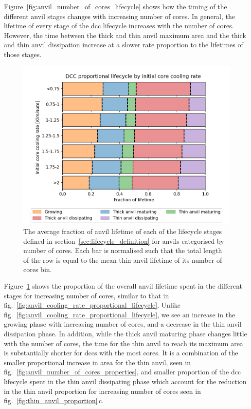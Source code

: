 Figure~\ref{fig:anvil_number_of_cores_lifecycle} shows how the timing of the different anvil stages changes with increasing number of cores.
In general, the lifetime of every stage of the \acrshort{dcc} lifecycle increases with the number of cores.
However, the time between the thick and thin anvil maximum area and the thick and thin anvil dissipation increase at a slower rate proportion to the lifetimes of those stages.

\begin{figure}[tp]
    \centering
    \includegraphics[width=\textwidth]{figures/chapter3_09.png}
    \caption[
    The average fraction of anvil lifetime of each lifecycle stage for anvils categorised by number of cores
    ]{
    The average fraction of anvil lifetime of each of the lifecycle stages defined in section~\ref{sec:lifecycle_definition} for anvils categorised by number of cores. Each bar is normalised such that the total length of the row is equal to the mean thin anvil lifetime of its number of cores bin.
    }
    \label{fig:anvil_number_of_cores_proportional_lifecycle}
\end{figure}

Figure~\ref{fig:anvil_number_of_cores_proportional_lifecycle} shows the proportion of the overall anvil lifetime spent in the different stages for increasing number of cores, similar to that in fig.~\ref{fig:anvil_cooling_rate_proportional_lifecycle}.
Unlike fig.~\ref{fig:anvil_cooling_rate_proportional_lifecycle}, we see an increase in the growing phase with increasing number of cores, and a decrease in the thin anvil dissipation phase.
In addition, while the thick anvil maturing phase changes little with the number of cores, the time for the thin anvil to reach its maximum area is substantially shorter for \acrshort{dcc}s with the most cores.
It is a combination of the smaller proportional increase in area for the thin anvil, seen in fig.~\ref{fig:anvil_number_of_cores_properties}, and smaller proportion of the \acrshort{dcc} lifecycle spent in the thin anvil dissipating phase which account for the reduction in the thin anvil proportion for increasing number of cores seen in fig.~\ref{fig:thin_anvil_proportion}\,c.

